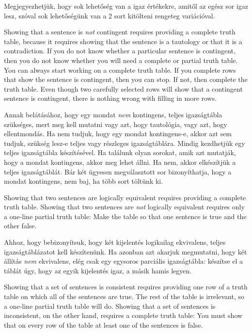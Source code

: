Megjegyezhetjük, hogy sok lehetőség van a igaz értékekre, amitől az egész sor igaz lesz, szóval sok lehetőségünk van a 2 sort kitölteni rengeteg variációval.

Showing that a sentence is \emph{not} contingent requires providing a complete truth table, because it requires showing that the sentence is a tautology or that it is a contradiction.  If you do not know whether a particular sentence is contingent, then you do not know whether you will need a complete or partial truth table. You can always start working on a complete truth table. If you complete rows that show the sentence is contingent, then you can stop. If not, then complete the truth table. Even though two carefully selected rows will show that a contingent sentence is contingent, there is nothing wrong with filling in more rows.

Annak belátásához, hogy egy mondat \emph{nem} kontingens, teljes igazságtábla szükséges, mert meg kell mutatni vagy azt, hogy tautológia, vagy azt, hogy ellentmondás. Ha nem tudjuk, hogy egy mondat kontingens-e, akkor azt sem tudjuk, szükség lesz-e teljes vagy részleges igazságtáblára. Mindig kezdhetjük egy teljes igazságtábla készítésével. Ha találunk olyan sorokat, amik azt mutatják, hogy a mondat kontingens, akkor meg lehet állni. Ha nem, akkor elkészítjük a teljes igazságtáblát. Bár két ügyesen megválasztott sor bizonyíthatja, hogy a mondat kontingens, nem baj, ha több sort töltünk ki.



Showing that two sentences are logically equivalent requires providing a complete truth table. Showing that two sentences are \emph{not} logically equivalent requires only a one-line partial truth table: Make the table so that one sentence is true and the other false.

Ahhoz, hogy bebizonyítsuk, hogy két kijelentés logikailag ekvivalens, teljes igazságtáblázatot kell készítenünk. Ha azonban azt akarjuk megmutatni, hogy két állítás \emph{nem} ekvivalens, elég csak egy egysoros parciális igazságtábla: készítse el a táblát úgy, hogy az egyik kijelentés igaz, a másik hamis legyen.

Showing that a set of sentences is consistent requires providing one row of a truth table on which all of the sentences are true. The rest of the table is irrelevant, so a one-line partial truth table will do. Showing that a set of sentences is inconsistent, on the other hand, requires a complete truth table: You must show that on every row of the table at least one of the sentences is false.


